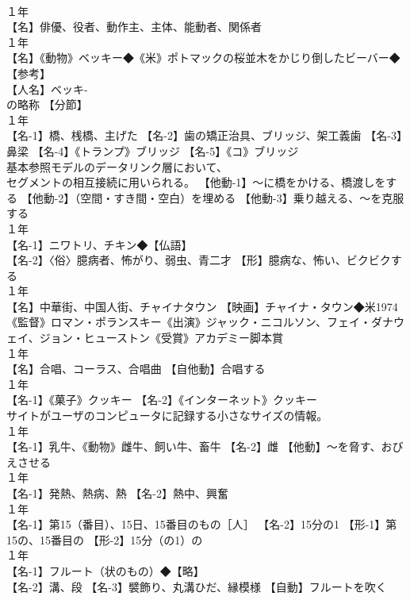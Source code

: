 \documentclass[8pt]{extreport}
\begin{document}
\begin{CJK}{UTF8}{min}
\\	１年	
\\	【名】俳優、役者、動作主、主体、能動者、関係者
\\	１年	
\\	【名】《動物》ベッキー◆《米》ポトマックの桜並木をかじり倒したビーバー◆【参考】
\\	【人名】ベッキ-
\\	の略称 【分節】
\\	１年	
\\	【名-1】橋、桟橋、主げた 【名-2】歯の矯正治具、ブリッジ、架工義歯 【名-3】鼻梁 【名-4】《トランプ》ブリッジ 【名-5】《コ》ブリッジ
\\	基本参照モデルのデータリンク層において、
\\	セグメントの相互接続に用いられる。 【他動-1】～に橋をかける、橋渡しをする 【他動-2】（空間・すき間・空白）を埋める 【他動-3】乗り越える、～を克服する
\\	１年	
\\	【名-1】ニワトリ、チキン◆【仏語】
\\	【名-2】〈俗〉臆病者、怖がり、弱虫、青二才 【形】臆病な、怖い、ビクビクする
\\	１年	
\\	【名】中華街、中国人街、チャイナタウン 【映画】チャイナ・タウン◆米1974《監督》ロマン・ポランスキー《出演》ジャック・ニコルソン、フェイ・ダナウェイ、ジョン・ヒューストン《受賞》アカデミー脚本賞
\\	１年	
\\	【名】合唱、コーラス、合唱曲 【自他動】合唱する
\\	１年	
\\	【名-1】《菓子》クッキー 【名-2】《インターネット》クッキー
\\	サイトがユーザのコンピュータに記録する小さなサイズの情報。
\\	１年	
\\	【名-1】乳牛、《動物》雌牛、飼い牛、畜牛 【名-2】雌 【他動】～を脅す、おびえさせる
\\	１年	
\\	【名-1】発熱、熱病、熱 【名-2】熱中、興奮
\\	１年	
\\	【名-1】第15（番目）、15日、15番目のもの［人］ 【名-2】15分の1 【形-1】第15の、15番目の 【形-2】15分（の1）の
\\	１年	
\\	【名-1】フルート（状のもの）◆【略】
\\	【名-2】溝、段 【名-3】襞飾り、丸溝ひだ、縁模様 【自動】フルートを吹く

\end{CJK}
\end{document}

